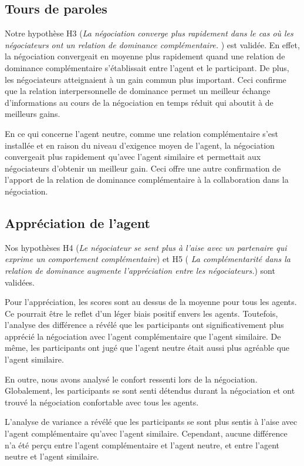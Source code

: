 \subsection{Tours de paroles}
	Notre hypothèse H3 (\textit{La négociation converge plus rapidement dans le cas où les négociateurs ont un relation de dominance complémentaire. }) est validée. En effet, la négociation convergeait en moyenne plus rapidement quand une relation de dominance complémentaire s'établissait entre l'agent et le participant. De plus, les négociateurs atteignaient à un gain commun plus important. Ceci confirme que la relation interpersonnelle de dominance permet un meilleur échange d'informations au cours de la négociation en temps réduit qui aboutit à de meilleurs gains. 
	
	En ce qui concerne l'agent neutre, comme une relation complémentaire s'est installée et en raison du niveau d'exigence moyen de l'agent, la négociation convergeait plus rapidement qu'avec l'agent similaire et permettait aux négociateurs d'obtenir un meilleur gain. Ceci offre une autre confirmation de l'apport de la relation de dominance complémentaire à la collaboration dans la négociation. 
	 
\subsection{Appréciation de l'agent}
 	Nos hypothèses H4 (\textit{Le négociateur se sent plus à l'aise avec un partenaire qui exprime un comportement complémentaire})  et H5 (\textit{ La complémentarité dans la relation de dominance augmente l'appréciation entre les négociateurs.}) sont validées. 
 	
	Pour l’appréciation, les scores sont au dessus de la moyenne pour tous les agents. Ce pourrait être le reflet d’un léger biais positif envers les agents. Toutefois, l'analyse des différence a révélé que les participants ont significativement plus apprécié la négociation avec l'agent complémentaire que l'agent similaire. De même, les participants ont jugé que l'agent neutre était aussi plus agréable que l'agent similaire. 
	
	En outre, nous avons analysé le confort ressenti lors de la négociation. Globalement, les participants se sont senti détendus durant la négociation et ont trouvé la négociation confortable avec tous les agents.  
	
	L'analyse de variance a révélé que les participants se sont plus sentis à l'aise avec l'agent complémentaire qu'avec l'agent similaire. Cependant, aucune différence n'a été perçu entre l'agent complémentaire et l'agent neutre, et entre l'agent neutre et l'agent similaire.
	
